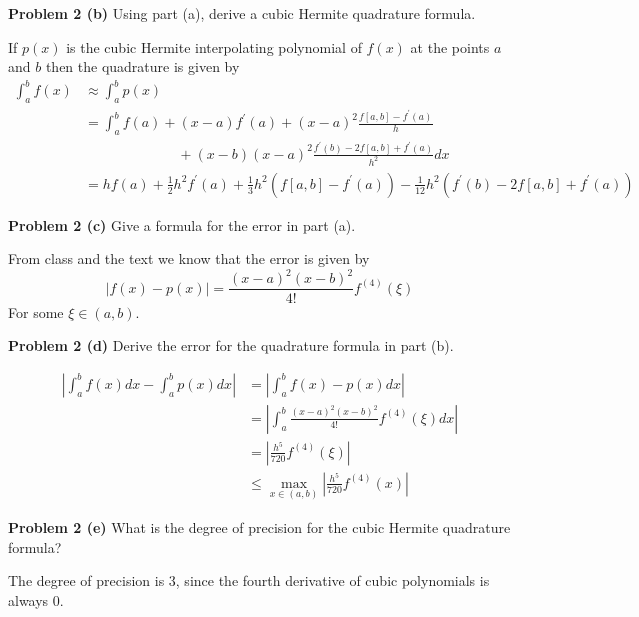 \documentclass[12pt]{article}
\newcommand{\problem}[1]{\hspace{-4 ex} \large \textbf{Problem #1} }
\begin{document}
\bigbreak
\problem{2 (b)} Using part (a), derive a cubic Hermite quadrature formula. \bigbreak

	If $p(x)$ is the cubic Hermite interpolating polynomial of $f(x)$ at the points $a$ and $b$ then the quadrature is given by
	\begin{align*}
		\int_a^b f(x) & \approx \int_a^b p(x) \\
		& = \int_a^b f(a) + (x-a)f^\prime(a) + (x-a)^2 \frac{f[a,b]-f^\prime(a)}{h} \\
		& \phantom{=====} + (x-b)(x-a)^2 \frac{f^\prime(b) - 2f[a,b] + f^\prime(a)}{h^2} dx \\
		& = hf(a) + \tfrac{1}{2}h^2f^\prime(a) + \tfrac{1}{3}h^2 (f[a,b]-f^\prime(a)) - \tfrac{1}{12}h^2 (f^\prime(b) - 2f[a,b] + f^\prime(a))
	\end{align*}
	
\bigbreak
\problem{2 (c)} Give a formula for the error in part (a). \bigbreak 

	From class and the text we know that the error is given by
	$$
	\vert f(x) - p(x) \vert = \frac{(x-a)^2(x-b)^2}{4!}f^{(4)}(\xi)
	$$
	For some $\xi \in (a,b)$.
	
\bigbreak
\problem{2 (d)} Derive the error for the quadrature formula in part (b). \bigbreak

	\begin{align*}
		\left \vert \int_a^b f(x) dx - \int_a^b p(x) dx \right \vert &= \left \vert \int_a^b f(x) - p(x) dx \right \vert \\
		& = \left \vert \int_a^b \frac{(x-a)^2(x-b)^2}{4!}f^{(4)}(\xi) dx \right \vert \\
		& = \left \vert \frac{h^5}{720}f^{(4)}(\xi) \right \vert \\
		& \leq \max_{x \in (a,b)}\left \vert \frac{h^5}{720}f^{(4)}(x) \right \vert
	\end{align*}
	
\bigbreak
\problem{2 (e)} What is the degree of precision for the cubic Hermite quadrature formula? \bigbreak

	The degree of precision is 3, since the fourth derivative of cubic polynomials is always 0.
\end{document}
